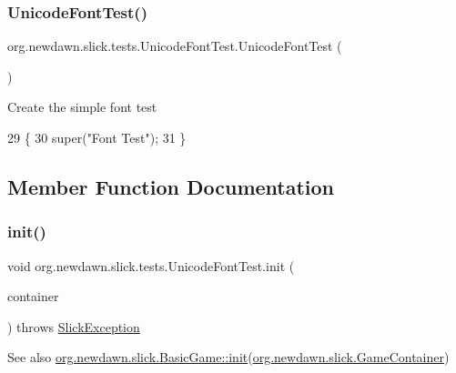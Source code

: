 \subsubsection{\texorpdfstring{Unicode\+Font\+Test()}{UnicodeFontTest()}}
{\footnotesize\ttfamily org.\+newdawn.\+slick.\+tests.\+Unicode\+Font\+Test.\+Unicode\+Font\+Test (\begin{DoxyParamCaption}{ }\end{DoxyParamCaption})\hspace{0.3cm}{\ttfamily [inline]}}

Create the simple font test 
\begin{DoxyCode}
29                              \{
30         super(\textcolor{stringliteral}{"Font Test"});
31     \}
\end{DoxyCode}


\subsection{Member Function Documentation}
\mbox{\label{classorg_1_1newdawn_1_1slick_1_1tests_1_1_unicode_font_test_a6ff30ae53e15f364bbd587d9d203968e}} 
\subsubsection{\texorpdfstring{init()}{init()}}
{\footnotesize\ttfamily void org.\+newdawn.\+slick.\+tests.\+Unicode\+Font\+Test.\+init (\begin{DoxyParamCaption}\item[{\mbox{\hyperlink{classorg_1_1newdawn_1_1slick_1_1_game_container}{Game\+Container}}}]{container }\end{DoxyParamCaption}) throws \mbox{\hyperlink{classorg_1_1newdawn_1_1slick_1_1_slick_exception}{Slick\+Exception}}\hspace{0.3cm}{\ttfamily [inline]}}

\begin{DoxySeeAlso}{See also}
\mbox{\hyperlink{classorg_1_1newdawn_1_1slick_1_1_basic_game_a8af0900217e4d389249f71367b22d114}{org.\+newdawn.\+slick.\+Basic\+Game\+::init}}(\mbox{\hyperlink{classorg_1_1newdawn_1_1slick_1_1_game_container}{org.\+newdawn.\+slick.\+Game\+Container}}) 
\end{DoxySeeAlso}


